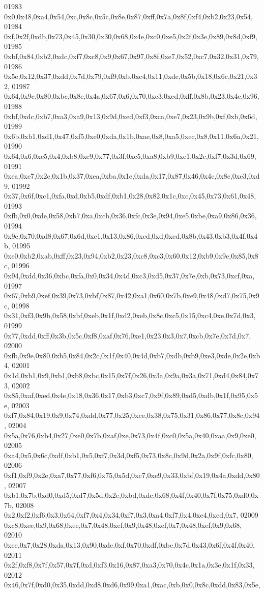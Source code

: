 \begin{DoxyCode}
01983   0x0,0x48,0xa4,0x54,0xc,0x8c,0x5c,0x8e,0x87,0xff,0x7a,0x8f,0xf4,0xb2,0x23,0x54,
01984   0xf,0x2f,0xdb,0x73,0x45,0x30,0x30,0x68,0x4e,0xc0,0xe5,0x2f,0x3e,0x89,0x8d,0xf9,
01985   0xbf,0x84,0xb2,0xdc,0xf7,0xc8,0x9,0x67,0x97,0x8f,0xe7,0x52,0xc7,0x32,0x31,0x79,
01986   0x5e,0x12,0x37,0xdd,0x7d,0x79,0xf9,0xb,0xc4,0x11,0xde,0x5b,0x18,0x6c,0x21,0x32,
01987   0x64,0x9c,0x80,0xbc,0x8e,0x4a,0x67,0x6,0x70,0xc3,0xed,0xff,0x8b,0x23,0x4e,0x96,
01988   0xbf,0xdc,0xb7,0xa3,0xa9,0x13,0x9d,0xed,0xf3,0xca,0xe7,0x23,0x9b,0xf,0xb,0x6d,
01989   0x6b,0xb1,0xd1,0x47,0xf5,0xe0,0xda,0x1b,0xae,0x8,0xa5,0xec,0x8,0x11,0x6a,0x21,
01990   0x64,0x6,0xc5,0x4,0xb8,0xe9,0x77,0x3f,0xc5,0xa8,0xb9,0xe1,0x2c,0xf7,0x3d,0x69,
01991   0xea,0xe7,0x2c,0x1b,0x37,0xea,0xba,0x1e,0xda,0x17,0x87,0x46,0x4c,0x8c,0xe3,0xd9,
01992   0x37,0x6f,0xc1,0xfa,0xd,0xb5,0xdf,0xb1,0x28,0x82,0x1c,0xc,0x45,0x73,0x61,0x48,
01993   0xfb,0x0,0xde,0x58,0xb7,0xa,0xcb,0x36,0xfc,0x3e,0x94,0xe5,0xbe,0xa9,0x86,0x36,
01994   0x9c,0x70,0xd8,0x67,0x6d,0xe1,0x13,0x86,0xcd,0xd,0xed,0x8b,0x43,0xb3,0x4f,0x4b,
01995   0xe0,0xb2,0xab,0xff,0x23,0x94,0xb2,0x23,0xc8,0xc3,0x60,0x12,0xb9,0x9e,0x85,0x8c,
01996   0x94,0xdd,0x36,0xbc,0xfa,0x0,0x34,0x4d,0xc3,0xd5,0x37,0x7e,0xb,0x73,0xcf,0xa,
01997   0x67,0xb9,0xef,0x39,0x73,0xbf,0x87,0x42,0xa1,0x60,0x7b,0xe9,0x48,0xd7,0x75,0x9c,
01998   0x31,0xf3,0x9b,0x58,0xbf,0xeb,0x1f,0xd2,0xeb,0x8c,0xc5,0x15,0xc4,0xe,0x7d,0x3,
01999   0x77,0xdd,0xff,0x3b,0x5c,0xf8,0xaf,0x76,0xe1,0x23,0x3,0x7,0xcb,0x7e,0x7d,0x7,
02000   0xfb,0x9e,0x80,0xb5,0x84,0x2c,0x1f,0x40,0x4d,0xb7,0xdb,0xb9,0xe3,0xde,0x2e,0xb4,
02001   0x1d,0xb1,0x9,0xb1,0xb8,0xbc,0x15,0x7f,0x26,0x3a,0x9a,0x3a,0x71,0xd4,0x84,0x73,
02002   0x85,0xaf,0xed,0x4e,0x18,0x36,0x17,0xb3,0xc7,0x9f,0x89,0xd5,0xdb,0x1f,0x95,0x5e,
02003   0xf7,0x84,0x19,0x9,0x74,0xdd,0x77,0x25,0xce,0x38,0x75,0x31,0x86,0x77,0x8c,0x94,
02004   0x5a,0x76,0xb4,0x27,0xe0,0x7b,0xaf,0xe,0x73,0x4f,0xc0,0x5a,0x40,0xaa,0x9,0xe0,
02005   0xa4,0x5,0x6c,0xdf,0xb1,0x5,0xf7,0x3d,0xf5,0x73,0x8c,0x9d,0x2a,0x9f,0xfc,0x80,
02006   0xf1,0xf9,0x2e,0xa7,0x77,0xf6,0x75,0x5d,0xc7,0xe9,0x33,0xbf,0x19,0x4a,0xdd,0x80,
02007   0xb1,0x7b,0xd0,0xd5,0xd7,0x5d,0x2e,0xbd,0xdc,0x68,0x4f,0x40,0x7f,0x75,0xd0,0x7b,
02008   0x2,0xf2,0xf6,0x3,0x64,0xf7,0x4,0x34,0xf7,0x3,0xa4,0xf7,0x4,0xe4,0xed,0x7,
02009   0xc8,0xee,0x9,0x68,0xee,0x7,0x48,0xef,0x9,0x48,0xef,0x7,0x48,0xef,0x9,0x68,
02010   0xee,0x7,0x28,0xda,0x13,0x90,0xde,0xf,0x70,0xdf,0xbe,0x7d,0x43,0x6f,0x4f,0x40,
02011   0x2f,0xf8,0x7f,0x57,0x7f,0xd,0xf3,0x16,0x87,0xa3,0x70,0x4c,0x1a,0x3e,0x1f,0x33,
02012   0x46,0x7f,0xd0,0x35,0xdd,0xd8,0xd6,0x99,0xa1,0xac,0xb,0x0,0x8c,0xdd,0x83,0x5e,

\end{DoxyCode}
